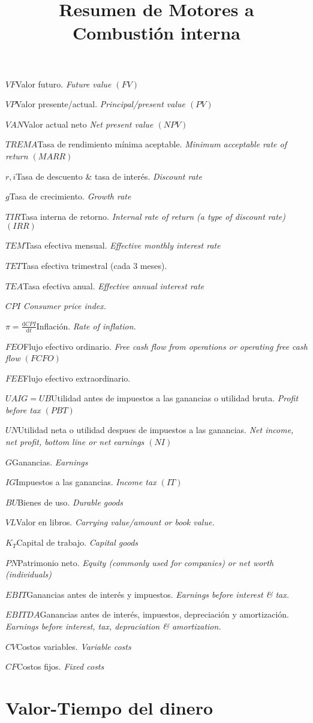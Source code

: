 \documentclass[twocolumn,10pt]{article}
\newcommand{\glossml}[3]{$#1$\indent #2 \emph{#3}  \par \vspace{.4cm} } %
\newcommand{\di}{\textrm{d}}
\begin{document}
\title{Resumen de Motores a Combustión interna}
{}
\glossml{VF}{Valor futuro.}{Future value $(FV)$}
\glossml{VP}{Valor presente/actual.}{Principal/present value $(PV)$}

\glossml{VAN}{Valor actual neto}{Net present value $(NPV)$}

\glossml{TREMA}{Tasa de rendimiento mínima aceptable.}{Minimum acceptable rate of return $(MARR)$}

\glossml{r,i}{Tasa de descuento \& tasa de interés.}{Discount rate}



\glossml{g}{Tasa de crecimiento.}{Growth rate}

\glossml{TIR}{Tasa interna de retorno.}{Internal rate of return (a type of discount rate) $(IRR)$}

\glossml{TEM}{Tasa efectiva mensual.}{Effective monthly interest rate}

\glossml{TET}{Tasa efectiva trimestral (cada 3 meses).}{}

\glossml{TEA}{Tasa efectiva anual.}{Effective annual interest rate}
\glossml{CPI}{}{Consumer price index.}
\glossml{\pi=\frac{\di CPI}{\di t}}{Inflación.}{Rate of inflation.}
\glossml{FEO}{Flujo efectivo ordinario.}{Free cash flow from operations or operating free cash flow $(FCFO)$}
\glossml{FEE}{Flujo efectivo extraordinario.}{}
\glossml{UAIG=UB}{Utilidad antes de impuestos a las ganancias o utilidad bruta.}{Profit before tax $(PBT)$}
\glossml{UN}{Utilidad neta o utilidad despues de impuestos a las ganancias.}{Net income, net profit, bottom line or net earnings $(NI)$}
\glossml{G}{Ganancias.}{Earnings}
\glossml{IG}{Impuestos a las ganancias.}{Income tax $(IT)$}
\glossml{BU}{Bienes de uso.}{Durable goods}

\glossml{VL}{Valor en libros.}{Carrying value/amount or book value.}
\glossml{K_T}{Capital de trabajo.}{Capital goods}

\glossml{PN}{Patrimonio neto.}{Equity (commonly used for companies) or net worth (individuals)}

\glossml{EBIT}{Ganancias antes de interés y impuestos.}{Earnings before interest \& tax.}
\glossml{EBITDA}{Ganancias antes de interés, impuestos, depreciación y amortización.}{Earnings before interest, tax, depraciation \& amortization.}
\glossml{CV}{Costos variables.}{Variable costs}
\glossml{CF}{Costos fijos.}{Fixed costs}



\section{Valor-Tiempo del dinero}
\end{document}
